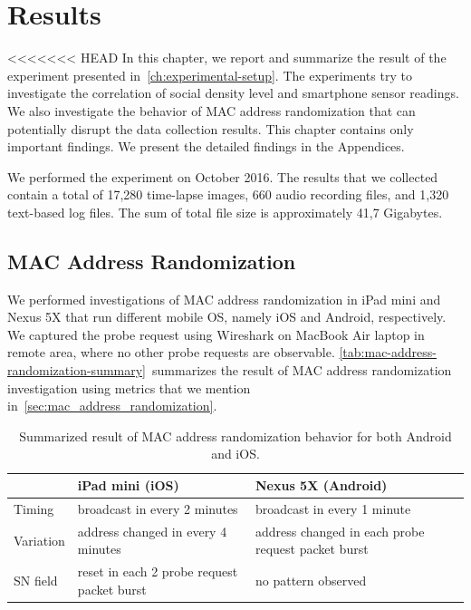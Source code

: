 \chapter{Results}
\label{ch:results} %
<<<<<<< HEAD
In this chapter, we report and summarize the result of the experiment presented in~\autoref{ch:experimental-setup}. The experiments try to investigate the correlation of social density level and smartphone sensor readings. We also investigate the behavior of \ac{MAC} address randomization that can potentially disrupt the data collection results. This chapter contains only important findings. We present the detailed findings in the Appendices.

We performed the experiment on October 2016. The results that we collected contain a total of 17,280 time-lapse images, 660 audio recording files, and 1,320 text-based log files. The sum of total file size is approximately 41,7 Gigabytes.

\section{MAC Address Randomization} %
\label{sec:mac-address-randomization}
We performed investigations of \ac{MAC} address randomization in iPad mini and Nexus 5X that run different mobile \ac{OS}, namely iOS and Android, respectively. We captured the probe request using Wireshark on MacBook Air laptop in remote area, where no other probe requests are observable. \autoref{tab:mac-address-randomization-summary}~summarizes the result of \ac{MAC} address randomization investigation using metrics that we mention in~\autoref{sec:mac_address_randomization}.

\begin{table}[ht]
\centering
\caption{Summarized result of \ac{MAC} address randomization behavior for both Android and iOS.}
\label{tab:mac-address-randomization-summary}
\begin{tabularx}{\textwidth}{lXX}
\toprule
                                        & iPad mini (iOS) & Nexus 5X (Android) \\
                                        \midrule
Timing    & broadcast in every 2 minutes & broadcast in every 1 minute \\ 
Variation & address changed in every 4 minutes & address changed in each probe request packet burst \\
\ac{SN} field & reset in each 2 probe request packet burst & no pattern observed \\ \bottomrule
\end{tabularx}
\end{table}

